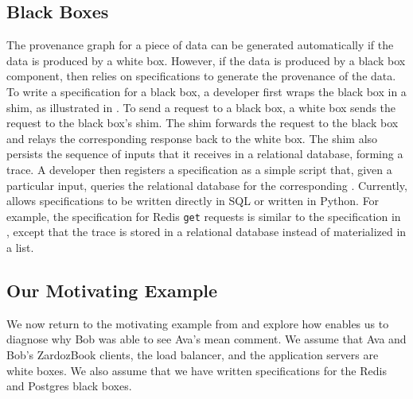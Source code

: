 \subsection{Black Boxes}
The provenance graph for a piece of data can be generated automatically if the
data is produced by a \fluent{} white box. However, if the data is produced by
a black box component, then \fluent{} relies on \watprovenance{} specifications
to generate the provenance of the data. To write a \watprovenance{}
specification for a black box, a developer first wraps the black box in a
\fluent{} shim, as illustrated in . To send a request to a
black box, a white box sends the request to the black box's shim. The shim
forwards the request to the black box and relays the corresponding response
back to the white box. The shim also persists the sequence of inputs that it
receives in a relational database, forming a trace. A developer then registers
a \watprovenance{} specification as a simple script that, given a particular
input, queries the relational database for the corresponding \watprovenance{}.
Currently, \fluent{} allows \watprovenance{} specifications to be written
directly in SQL or written in Python. For example, the \watprovenance{}
specification for Redis \texttt{get} requests is similar to the specification
in , except that the trace is stored in a relational
database instead of materialized in a list.

{}

\subsection{Our Motivating Example}
\newcommand{\systemname}{ZardozBook}
We now return to the motivating example from  and
explore how \fluent{} enables us to diagnose why Bob was able to see Ava's mean
comment. We assume that Ava and Bob's \systemname{} clients, the load balancer,
and the application servers are \fluent{} white boxes. We also assume that we
have written \watprovenance{} specifications for the Redis and Postgres black
boxes.

